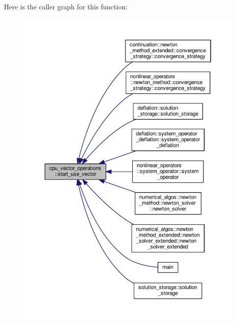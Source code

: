 Here is the caller graph for this function\-:
\nopagebreak
\begin{figure}[H]
\begin{center}
\leavevmode
\includegraphics[width=350pt]{structcpu__vector__operations_a36ce15d54cfb2b08aeeb25d7e601e342_icgraph}
\end{center}
\end{figure}


